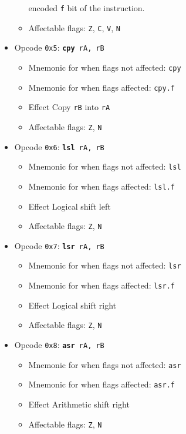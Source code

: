 \documentclass{article}
\begin{document}
\begin{itemize}
\begin{itemize}
		encoded \texttt{f} bit of the instruction.
		\item Affectable flags:
			\texttt{Z}, \texttt{C}, \texttt{V}, \texttt{N}
		\end{itemize}
	\item Opcode \texttt{0x5}:
		\texttt{\textbf{cpy} rA, rB}
		\begin{itemize}
		\item Mnemonic for when flags not affected: \texttt{cpy}
		\item Mnemonic for when flags affected: \texttt{cpy.f}
		\item Effect Copy \texttt{rB} into \texttt{rA}
		\item Affectable flags:
			\texttt{Z}, \texttt{N}
		\end{itemize}
	\item Opcode \texttt{0x6}:
		\texttt{\textbf{lsl} rA, rB}
		\begin{itemize}
		\item Mnemonic for when flags not affected: \texttt{lsl}
		\item Mnemonic for when flags affected: \texttt{lsl.f}
		\item Effect Logical shift left
		\item Affectable flags:
			\texttt{Z}, \texttt{N}
		\end{itemize}
	\item Opcode \texttt{0x7}:
		\texttt{\textbf{lsr} rA, rB}
		\begin{itemize}
		\item Mnemonic for when flags not affected: \texttt{lsr}
		\item Mnemonic for when flags affected: \texttt{lsr.f}
		\item Effect Logical shift right
		\item Affectable flags:
			\texttt{Z}, \texttt{N}
		\end{itemize}
	\item Opcode \texttt{0x8}:
		\texttt{\textbf{asr} rA, rB}
		\begin{itemize}
		\item Mnemonic for when flags not affected: \texttt{asr}
		\item Mnemonic for when flags affected: \texttt{asr.f}
		\item Effect Arithmetic shift right
		\item Affectable flags:
			\texttt{Z}, \texttt{N}
		\end{itemize}

\end{itemize}
\end{document}
